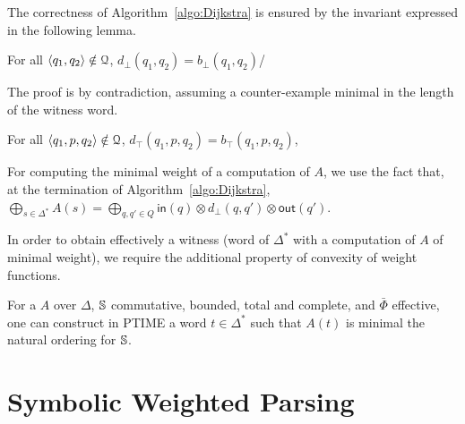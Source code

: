 The correctness of Algorithm~\ref{algo:Dijkstra}
is ensured by the invariant expressed in the following lemma.
\begin{lemma}\label{lem:bot}
For all $\< q_1, q_2> \notin \Q$,
$d_\bot(q_1, q_2) =  b_\bot(q_1, q_2)$/
\end{lemma}
The proof is by contradiction,
assuming a counter-example minimal in the length of the witness word.

\begin{lemma}\label{lem:top}
For all $\< q_1, p, q_2> \notin \Q$,
$d_\top(q_1, p, q_2) =  b_\top(q_1, p, q_2)$,
\end{lemma}

\noindent
For computing the minimal weight of a computation of $A$, we use the fact that,
at the termination of Algorithm~\ref{algo:Dijkstra}, %
\(
  {\displaystyle \bigoplus_{s \in \Delta^*} A(s)} =
  {\displaystyle\bigoplus_{q, q' \in Q}} \textstyle
  \mathsf{in}(q) \mathop{\otimes} d_\bot(q, q') \mathop{\otimes} \mathsf{out}(q').
\)

\noindent
In order to obtain effectively a witness
(word of $\Delta^*$ with a computation of $A$ of minimal weight),
we require the additional property of convexity of weight functions.

\begin{proposition}\label{th:best-search}
For a \SWVPA $A$
over $\Delta$,
$\mathbb{S}$ commutative, bounded, total and complete, %
and $\bar\Phi$ effective, %
one can construct in PTIME a word $t \in \Delta^*$
such that $A(t)$ is minimal \wrt the natural ordering for $\mathbb{S}$.
\end{proposition}





\section{Symbolic Weighted Parsing}
\label{sec:parsing}

